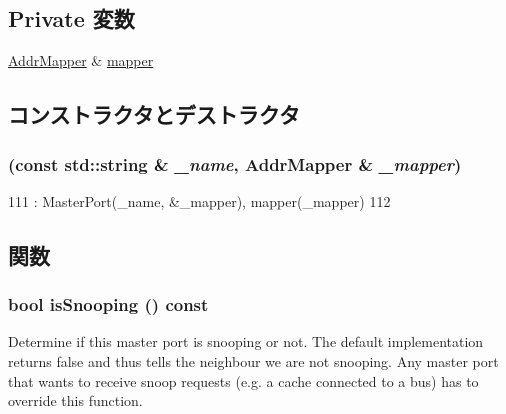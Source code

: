 \subsection*{Private 変数}
\begin{DoxyCompactItemize}
\item 
\hyperlink{classAddrMapper_1_1AddrMapper}{AddrMapper} \& \hyperlink{classAddrMapper_1_1MapperMasterPort_a85ab1c024f81c47e0a2c4e4261eabfb4}{mapper}
\end{DoxyCompactItemize}


\subsection{コンストラクタとデストラクタ}
\hypertarget{classAddrMapper_1_1MapperMasterPort_af25f3129245e33f5b2d5480811ce14c3}{
\subsubsection[{MapperMasterPort}]{ (const std::string \& {\em \_\-name}, \/  {\bf AddrMapper} \& {\em \_\-mapper})}}
\label{classAddrMapper_1_1MapperMasterPort_af25f3129245e33f5b2d5480811ce14c3}



\begin{DoxyCode}
111             : MasterPort(_name, &_mapper), mapper(_mapper)
112         { }
\end{DoxyCode}


\subsection{関数}
\hypertarget{classAddrMapper_1_1MapperMasterPort_a5ce11b7a254d3cb756d94568f7cbc25d}{
\subsubsection[{isSnooping}]{\setlength{\rightskip}{0pt plus 5cm}bool isSnooping () const}}
\label{classAddrMapper_1_1MapperMasterPort_a5ce11b7a254d3cb756d94568f7cbc25d}
Determine if this master port is snooping or not. The default implementation returns false and thus tells the neighbour we are not snooping. Any master port that wants to receive snoop requests (e.g. a cache connected to a bus) has to override this function.

